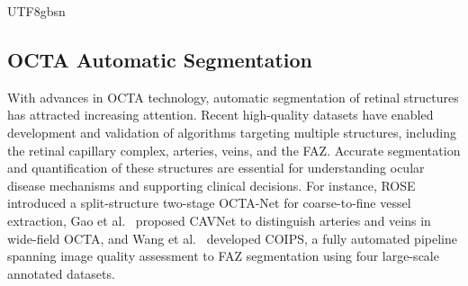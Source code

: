 \documentclass[times, review, 10pt]{elsarticle}
\begin{document}
\begin{CJK}{UTF8}{gbsn}
\subsection{OCTA Automatic Segmentation}



With advances in OCTA technology, automatic segmentation of retinal structures has attracted increasing attention. Recent high-quality datasets have enabled development and validation of algorithms targeting multiple structures, including the retinal capillary complex, arteries, veins, and the FAZ. Accurate segmentation and quantification of these structures are essential for understanding ocular disease mechanisms and supporting clinical decisions. For instance, ROSE~\cite{ref7} introduced a split-structure two-stage OCTA-Net for coarse-to-fine vessel extraction, Gao et al.~\cite{ref8} proposed CAVNet to distinguish arteries and veins in wide-field OCTA, and Wang et al.~\cite{ref9} developed COIPS, a fully automated pipeline spanning image quality assessment to FAZ segmentation using four large-scale annotated datasets.
\par

\end{CJK}
\end{document}
